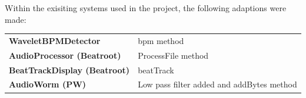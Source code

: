 \documentclass[a4paper, 11pt]{article}
\begin{document}
Within the exisiting systems used in the project, the following adaptions were made:

\begin{tabular}{l p{4.5in}  }\\
\textbf{WaveletBPMDetector} & bpm method\\
\textbf{AudioProcessor (Beatroot)} & ProcessFile method\\
\textbf{BeatTrackDisplay (Beatroot)} & beatTrack\\
\textbf{AudioWorm (PW)} & Low pass filter added and addBytes method\\
\end{tabular}
\end{document}
